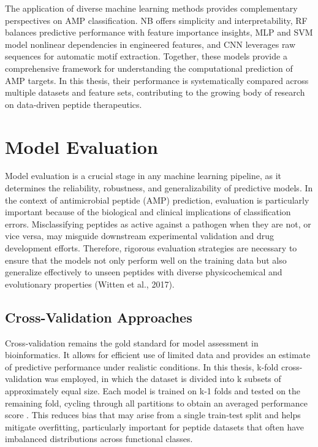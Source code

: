 \documentclass[a4paper,twoside,12pt]{book}
\begin{document}
The application of diverse machine learning methods provides complementary perspectives on AMP classification. NB offers simplicity and interpretability, RF balances predictive performance with feature importance insights, MLP and SVM model nonlinear dependencies in engineered features, and CNN leverages raw sequences for automatic motif extraction. Together, these models provide a comprehensive framework for understanding the computational prediction of AMP targets. In this thesis, their performance is systematically compared across multiple datasets and feature sets, contributing to the growing body of research on data-driven peptide therapeutics.

\section{Model Evaluation}

Model evaluation is a crucial stage in any machine learning pipeline, as it determines the reliability, robustness, and generalizability of predictive models. In the context of antimicrobial peptide (AMP) prediction, evaluation is particularly important because of the biological and clinical implications of classification errors. Misclassifying peptides as active against a pathogen when they are not, or vice versa, may misguide downstream experimental validation and drug development efforts. Therefore, rigorous evaluation strategies are necessary to ensure that the models not only perform well on the training data but also generalize effectively to unseen peptides with diverse physicochemical and evolutionary properties (Witten et al., 2017).

\subsection{Cross-Validation Approaches}

Cross-validation remains the gold standard for model assessment in bioinformatics. It allows for efficient use of limited data and provides an estimate of predictive performance under realistic conditions. In this thesis, k-fold cross-validation was employed, in which the dataset is divided into k subsets of approximately equal size. Each model is trained on k-1 folds and tested on the remaining fold, cycling through all partitions to obtain an averaged performance score \cite{bib:kohavi1995}. This reduces bias that may arise from a single train-test split and helps mitigate overfitting, particularly important for peptide datasets that often have imbalanced distributions across functional classes.
\end{document}
